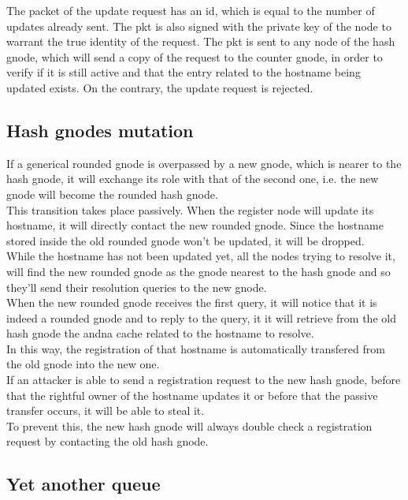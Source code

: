 \documentclass[a4paper]{article}
\begin{document}
The packet of the update request has an id, which is equal to the number of
updates already sent. The pkt is also signed with the private key of the
node to warrant the true identity of the request.
The pkt is sent to any node of the hash gnode, which will send a copy of the
request to the counter gnode, in order to verify if it is still active and
that the entry related to the hostname being updated exists. On the
contrary, the update request is rejected.

\subsection{Hash gnodes mutation}
 
If a generical rounded gnode is overpassed by a new gnode, which is nearer
to the hash gnode, it will exchange its role with that of the second one, i.e.
the new gnode will become the rounded hash gnode.\\

This transition takes place passively. When the register node will update
its hostname, it will directly contact the new rounded gnode. Since the
hostname stored inside the old rounded gnode won't be updated, it will be
dropped.\\

While the hostname has not been updated yet, all the nodes trying
to resolve it, will find the new rounded gnode as the gnode nearest to the
hash gnode and so they'll send their resolution queries to the new gnode.\\
When the  new rounded gnode receives the first query, it will notice that it
is indeed a rounded gnode and to reply to the query, it it will retrieve from
the old hash gnode the andna cache related to the hostname to resolve.\\
In this way, the registration of that hostname is automatically transfered
from the old gnode into the new one.\\

If an attacker is able to send a registration request to the new hash gnode,
before that the rightful owner of the hostname updates it or before that the
passive transfer occurs, it will be able to steal it.\\
To prevent this, the new hash gnode will always double check a registration
request by contacting the old hash gnode.

\subsection{Yet another queue}
  
\end{document}
